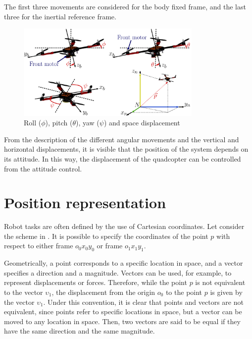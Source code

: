  The first three movements are considered for the body fixed frame, and the last three for the inertial reference frame.
 \begin{figure}[h!]
     \centering
     \includegraphics[width =0.8\textwidth]{figures/rollpitchyaw2.pdf}
     \caption{Roll ($\phi$), pitch ($\theta$), yaw ($\psi$) and space displacement}
     \label{fig:angmotion}
   \end{figure}

 From the description of the different angular movements and the vertical and horizontal displacements, it is visible that the position of the system depends on its attitude. In this way, the displacement of the quadcopter can be controlled from the attitude control.


 \section{Position representation}

 Robot tasks are often defined by the use of Cartesian coordinates. Let consider the scheme in . It is possible to specify the coordinates of the point $p$ with respect to either frame $o_0x_0y_0$ or frame $o_1x_1y_1$.

 Geometrically, a point corresponds to a specific location in space, and a vector specifies a direction and a magnitude. Vectors can be used, for example, to represent displacements or forces. Therefore, while the point $p$ is not equivalent to the vector $\upsilon_1$, the displacement from the origin $o_0$ to the point $p$ is given by the vector $\upsilon_1$. Under this convention, it is clear that points and vectors are not equivalent, since points refer to specific locations in space, but a vector can be moved to any location in space. Then, two vectors are said to be equal if they have the same direction and the same magnitude.

